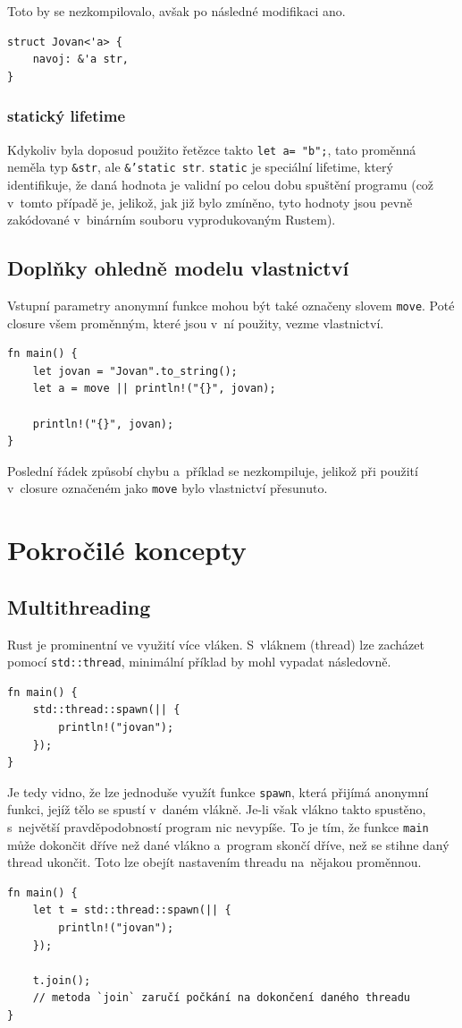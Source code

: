\documentclass[a4paper, 12pt, twoside]{article} %
\newcommand{\rust}[1]{\texttt{#1}}
\begin{document}
			Toto by se nezkompilovalo, avšak po následné modifikaci ano.
			\begin{verbatim}
struct Jovan<'a> {
	navoj: &'a str,
}
			\end{verbatim}
			
			\subsubsection*{statický lifetime}
				Kdykoliv byla doposud použito řetězce takto \rust{let a= "b";}, tato proměnná neměla typ \rust{&str}, ale \rust{&'static str}. \rust{static} je speciální lifetime, který identifikuje, že daná hodnota je validní po celou dobu spuštění programu (což v~tomto případě je, jelikož, jak již bylo zmíněno, tyto hodnoty jsou pevně zakódované v~binárním souboru vyprodukovaným Rustem).


			\subsection{Doplňky ohledně modelu vlastnictví}
				Vstupní parametry anonymní funkce mohou být také označeny slovem \rust{move}. Poté closure všem proměnným, které jsou v~ní použity, vezme vlastnictví. 
				\begin{verbatim}
fn main() {
	let jovan = "Jovan".to_string();
	let a = move || println!("{}", jovan);

	println!("{}", jovan);
}
				\end{verbatim}

				Poslední řádek způsobí chybu a~příklad se nezkompiluje, jelikož při použití v~closure označeném jako \rust{move} bylo vlastnictví přesunuto.

\section{Pokročilé koncepty}
	\subsection{Multithreading}
		Rust je prominentní ve využití více vláken. S~vláknem (thread) lze zacházet pomocí \rust{std::thread}, minimální příklad by mohl vypadat následovně.
		\begin{verbatim}
fn main() {
	std::thread::spawn(|| {
		println!("jovan");
	});
}
		\end{verbatim}
		
		Je tedy vidno, že lze jednoduše využít funkce \rust{spawn}, která přijímá anonymní funkci, jejíž tělo se spustí v~daném vlákně. Je-li však vlákno takto spustěno, s~největší pravděpodobností program nic nevypíše. To je tím, že funkce \rust{main} může dokončit dříve než dané vlákno a~program skončí dříve, než se stihne daný thread ukončit. Toto lze obejít nastavením threadu na~nějakou proměnnou.
		\begin{verbatim}
fn main() {
	let t = std::thread::spawn(|| {
		println!("jovan");
	});
	
	t.join();
	// metoda `join` zaručí počkání na dokončení daného threadu
}
		\end{verbatim}
		
\end{document}
